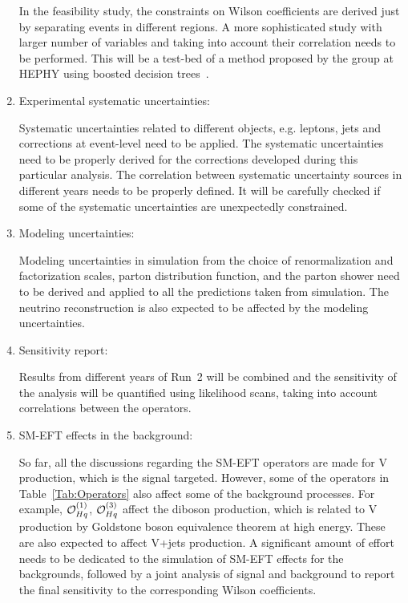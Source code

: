 \documentclass[a4paper,11pt]{article}
\renewcommand{\PV}{{{{V}}}\xspace}
\newcommand{\VH}{{{\PV}{\PH}}\xspace}
\begin{document}
\begin{enumerate}
In the feasibility study, the constraints on Wilson coefficients are derived just by separating events in different regions. A more sophisticated study with larger number of variables and taking into account their correlation needs to be performed. 
This will be a test-bed of a method proposed by the group at HEPHY using boosted decision trees~\cite{Chatterjee:2021nms}. 

\item Experimental systematic uncertainties: 

Systematic uncertainties related to different objects, e.g. leptons, jets and corrections at event-level need to be applied. The systematic uncertainties need to be properly derived for the corrections developed during this particular analysis. 
The correlation between systematic uncertainty sources in different years needs to be properly defined. 
It will be carefully checked if some of the systematic uncertainties are unexpectedly constrained. 

\item Modeling uncertainties: 

Modeling uncertainties in simulation from the choice of renormalization and factorization scales, parton distribution function, and the parton shower need to be derived and applied to all the predictions taken from simulation. 
The neutrino reconstruction is also expected to be affected by the modeling uncertainties. 

\item Sensitivity report: 

Results from different years of Run~2 will be combined and
the sensitivity of the analysis will be quantified using likelihood scans, taking into account correlations between the operators. 


\item SM-EFT effects in the background:

So far, all the discussions regarding the SM-EFT operators are made for \VH production, which is the signal targeted. However, some of the operators in Table~\ref{Tab:Operators} also affect some of the background processes. 
For example, ${\cal O}^{(1)}_{Hq}$, ${\cal O}^{(3)}_{Hq}$ affect the diboson production, which is related to \VH production by Goldstone boson equivalence theorem at high energy. 
These are also expected to affect {\PV}+jets production. 
A significant amount of effort needs to be dedicated to the simulation of SM-EFT effects for the backgrounds, followed by a joint analysis of signal and background to report the final sensitivity to the corresponding Wilson coefficients. 


\end{enumerate}
\end{document}
